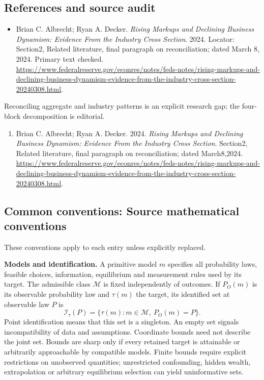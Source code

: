 \documentclass[11pt,a4paper]{article}
\begin{document}
\subsection*{References and source audit}
\begin{itemize}
\item Brian C. Albrecht; Ryan A. Decker. \emph{Rising Markups and Declining Business Dynamism: Evidence From the Industry Cross Section}. 2024. Locator: Section2, Related literature, final paragraph on reconciliation; dated March 8, 2024. Primary text checked. \url{https://www.federalreserve.gov/econres/notes/feds-notes/rising-markups-and-declining-business-dynamism-evidence-from-the-industry-cross-section-20240308.html}.
\end{itemize}
Reconciling aggregate and industry patterns is an explicit research gap; the four-block decomposition is editorial.
\begin{enumerate}\raggedright
\item\hypertarget{definitions:source:30007546:1}{} Brian C. Albrecht; Ryan A. Decker. 2024. \emph{Rising Markups and Declining Business Dynamism: Evidence From the Industry Cross Section}. Section2, Related literature, final paragraph on reconciliation; dated March8,2024.
\url{https://www.federalreserve.gov/econres/notes/feds-notes/rising-markups-and-declining-business-dynamism-evidence-from-the-industry-cross-section-20240308.html}.
\end{enumerate}

\subsection*{Common conventions: Source mathematical conventions}

These conventions apply to each entry unless explicitly replaced.

\textbf{Models and identification.} A primitive model \(m\) specifies all probability laws, feasible choices, information, equilibrium and measurement rules used by its target. The admissible class \(\mathcal M\) is fixed independently of outcomes. If \(P_O(m)\) is its observable probability law and \(\tau(m)\) the target, its identified set at observable law \(P\) is
\[
 \mathcal I_\tau(P)=\{\tau(m):m\in\mathcal M,\ P_O(m)=P\}.
\]
Point identification means that this set is a singleton. An empty set signals incompatibility of data and assumptions. Coordinate bounds need not describe the joint set. Bounds are sharp only if every retained target is attainable or arbitrarily approachable by compatible models. Finite bounds require explicit restrictions on unobserved quantities; unrestricted confounding, hidden wealth, extrapolation or arbitrary equilibrium selection can yield uninformative sets.
\end{document}
